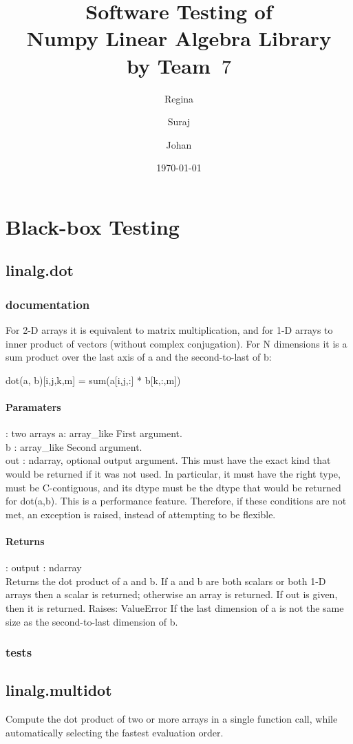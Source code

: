 \documentclass[a4paper,11pt]{article}
\title{\textbf{Software Testing of \\ Numpy Linear Algebra Library\\
        by Team~$7$                                   %
}
}
\author{Regina \and Suraj \and Johan}  %
\date{\today}
\begin{document}
	
	
\section{Black-box Testing}
\subsection{linalg.dot}
\subsubsection{documentation}
For 2-D arrays it is equivalent to matrix multiplication, and for 1-D arrays to inner product of vectors (without complex conjugation). For N dimensions it is a sum product over the last axis of a and the second-to-last of b:

    dot(a, b)[i,j,k,m] = sum(a[i,j,:] * b[k,:,m])
   \paragraph{Paramaters}: two arrays a: array\_like First argument.\\
b : array\_like Second argument.\\
out : ndarray, optional output argument. This must have the exact kind that would be returned if it was not used. In particular, it must have the right type, must be C-contiguous, and its dtype must be the dtype that would be returned for dot(a,b). This is a performance feature. Therefore, if these conditions are not met, an exception is raised, instead of attempting to be flexible.
    \paragraph{Returns}:    output : ndarray\\
Returns the dot product of a and b. If a and b are both scalars or both 1-D arrays then a scalar is returned; otherwise an array is returned. If out is given, then it is returned.
Raises: 
ValueError
If the last dimension of a is not the same size as the second-to-last dimension of b.


\subsubsection{tests}


\subsection{linalg.multidot}
Compute the dot product of two or more arrays in a single function call, while automatically selecting the fastest evaluation order.
\end{document}
